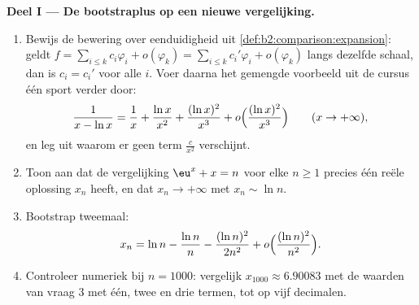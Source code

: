 \begin{problem}
\label{pb:b2:comparison:1}

\medskip
\noindent\textbf{Deel I --- De bootstraplus op een nieuwe
vergelijking.}
\begin{enumerate}
  \item Bewijs de bewering over eenduidigheid uit
        \cref{def:b2:comparison:expansion}: geldt $f = \sum_{i\leq
        k} c_i\varphi_i + o(\varphi_k) = \sum_{i \leq k}
        c_i'\varphi_i + o(\varphi_k)$ langs dezelfde schaal, dan
        is $c_i = c_i'$ voor alle $i$. Voer daarna het gemengde
        voorbeeld uit de cursus één sport verder door:
        \[
        \frac{1}{x - \ln x} = \frac1x + \frac{\ln x}{x^2} +
        \frac{(\ln x)^2}{x^3} + o\Bigl(\frac{(\ln
        x)^2}{x^3}\Bigr) \qquad (x \to +\infty),
        \]
        en leg uit waarom er geen term $\frac{c}{x^2}$
        verschijnt.
  \item Toon aan dat de vergelijking $\eu^x + x = n$ voor elke $n
        \geq 1$ precies één reële oplossing $x_n$ heeft, en dat
        $x_n \to +\infty$ met $x_n \sim \ln n$.
  \item Bootstrap tweemaal:
        \[
        x_n = \ln n - \frac{\ln n}{n} - \frac{(\ln n)^2}{2n^2} +
        o\Bigl(\frac{(\ln n)^2}{n^2}\Bigr).
        \]
  \item Controleer numeriek bij $n = 1000$: vergelijk $x_{1000}
        \approx 6.90083$ met de waarden van vraag 3 met één, twee
        en drie termen, tot op vijf decimalen.
\end{enumerate}


\end{problem}
